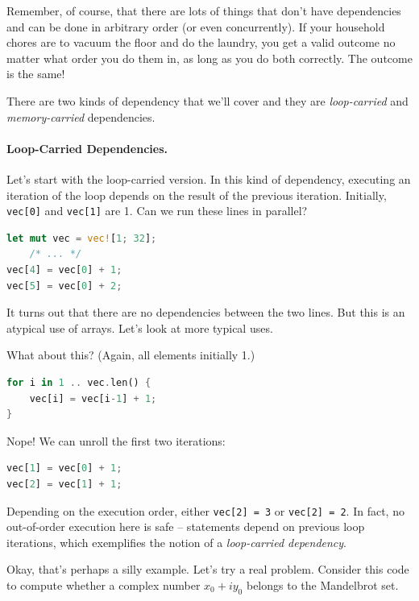 Remember, of course, that there are lots of things that don't have dependencies and can be done in arbitrary order (or even concurrently). If your household chores are to vacuum the floor and do the laundry, you get a valid outcome no matter what order you do them in, as long as you do both correctly. The outcome is the same!

There are two kinds of dependency that we'll cover and they are \emph{loop-carried} and \emph{memory-carried} dependencies.

\paragraph{Loop-Carried Dependencies.} Let's start with the loop-carried version. In this kind of dependency, executing an iteration of the loop depends on the result of the previous iteration. Initially, {\tt vec[0]} and {\tt vec[1]} are 1. Can we run these lines in parallel?

\begin{lstlisting}[language=Rust]
let mut vec = vec![1; 32];
    /* ... */
vec[4] = vec[0] + 1;
vec[5] = vec[0] + 2;
\end{lstlisting}


It turns out that there are no dependencies between the two lines. But this is
an atypical use of arrays. Let's look at more typical uses.

What about this? (Again, all elements initially 1.)

\begin{lstlisting}[language=Rust]
for i in 1 .. vec.len() {
    vec[i] = vec[i-1] + 1;
}
\end{lstlisting}

Nope! We can unroll the first two iterations:
\begin{lstlisting}[language=Rust]
vec[1] = vec[0] + 1;
vec[2] = vec[1] + 1;
\end{lstlisting}

Depending on the execution order, either {\tt vec[2] = 3} or {\tt vec[2] =
  2}. In fact, no out-of-order execution here is safe -- statements depend
on previous loop iterations, which exemplifies the notion of a
\emph{loop-carried dependency}. 

Okay, that's perhaps a silly example. 
Let's try a real problem. Consider this code to compute whether a complex number $x_0 + iy_0$ belongs to the Mandelbrot set.

